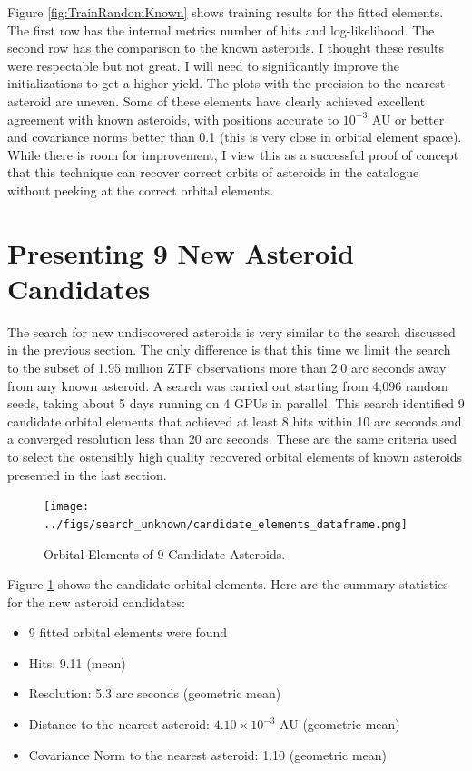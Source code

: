 Figure \ref{fig:TrainRandomKnown} shows training results for the fitted elements.
The first row has the internal metrics number of hits and log-likelihood.
The second row has the comparison to the known asteroids.
I thought these results were respectable but not great.
I will need to significantly improve the initializations to get a higher yield.
The plots with the precision to the nearest asteroid are uneven.  
Some of these elements have clearly achieved excellent agreement with known asteroids, 
with positions accurate to $10^{-3}$ AU or better and covariance norms better than 0.1 (this is very close in orbital element space).
While there is room for improvement, I view this as a successful proof of concept that this technique can recover correct orbits of asteroids 
in the catalogue without peeking at the correct orbital elements.

\section{Presenting 9 New Asteroid Candidates}
\label{section_results_unknown_ast}
The search for new undiscovered asteroids is very similar to the search discussed in the previous section.
The only difference is that this time we limit the search to the subset of 
1.95 million ZTF observations more than 2.0 arc seconds away from any known asteroid.
A search was carried out starting from 4,096 random seeds, taking about 5 days running on 4 GPUs in parallel.
This search identified 9 candidate orbital elements that achieved at least 8 hits within 10 arc seconds
and a converged resolution less than 20 arc seconds.
These are the same criteria used to select the ostensibly high quality recovered orbital elements of known asteroids presented in the last section.

\begin{figure}[h]
\begin{center}
\texttt{[image: ../figs/search\_unknown/candidate\_elements\_dataframe.png]}
\end{center}
\caption{Orbital Elements of 9 Candidate Asteroids.}
\label{fig:CandidateOrbitalElements}
\end{figure}
Figure \ref{fig:CandidateOrbitalElements} shows the candidate orbital elements.
Here are the summary statistics for the new asteroid candidates:
\begin{itemize}
\item 9 fitted orbital elements were found
\item Hits: 9.11 (mean)
\item Resolution: 5.3 arc seconds (geometric mean)
\item Distance to the nearest asteroid: $4.10 \times 10^{-3}$ AU (geometric mean)
\item Covariance Norm to the nearest asteroid: 1.10 (geometric mean)
\end{itemize}

